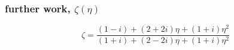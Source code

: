 
\subsubsection{further work, $\zeta(\eta)$}









\[
\zeta = \frac{(1 - i) + (2 + 2i)\eta + (1 + i)\eta^2}{(1 + i) + (2 - 2i)\eta + (1 + i)\eta^2}
\]
\pagebreak
%
%
